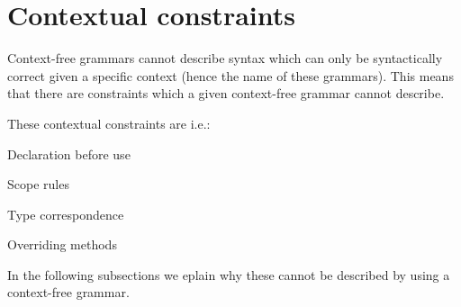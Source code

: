 \section{Contextual constraints}
\label{sec:contextualconstraints}

Context-free grammars cannot describe syntax which can only be syntactically
correct given a specific context (hence the name of these grammars). This means
that there are constraints which a given context-free grammar cannot describe.

These contextual constraints are i.e.\cite[pg. 39]{plpp}:

\begin{dlist}
\item Declaration before use
\item Scope rules
\item Type correspondence
\item Overriding methods
\end{dlist}

In the following subsections we eplain why these cannot be described by using a
context-free grammar.








